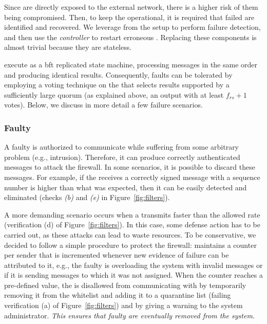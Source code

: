 Since \presieves are directly exposed to the external network, there is a higher risk of them being compromised.
Then, to keep the \sieveq operational, it is required that failed \presieves are identified and recovered.
We leverage from the \repsieve setup to perform failure detection, and then use the \emph{controller} to restart erroneous \presieves.
Replacing these components is almost trivial because they are stateless.

\Repsieves execute as a \gls{bft} replicated state machine, processing messages in the same order and producing identical results.
Consequently, \repsieves faults can be tolerated by employing a voting technique on the \postsieve that selects results supported by a sufficiently large quorum (as explained above, an output with at least $f_{rs} + 1$ votes).
Below, we discuss in more detail a few failure scenarios.



\subsubsection{Faulty \Sender}


A faulty \sender is authorized to communicate while suffering from some arbitrary problem (e.g., intrusion). 
Therefore, it can produce correctly authenticated messages to attack the firewall. 
In some scenarios, it is possible to discard these messages. 
For example, if the \sieveq receives a correctly signed message with a sequence number is higher than what was expected, then it can be easily detected and eliminated (checks \emph{(b)} and \emph{(e)} in Figure~\ref{fig:filters}).

A more demanding scenario occurs when a \sender transmits faster than the allowed rate (verification (d) of Figure~\ref{fig:filters}).
In this case, some defense action has to be carried out, as these attacks can lead \sieveq to waste resources.
To be conservative, we decided to follow a simple procedure to protect the firewall: \sieveq maintains a counter per sender that is incremented whenever new evidence of failure can be attributed to it, e.g., the faulty \sender is overloading the system with invalid messages or if it is sending messages to \presieves which it was not assigned.
When the counter reaches a pre-defined value, the \sender is disallowed from communicating with \sieveq by temporarily removing it from the whitelist and adding it to a quarantine list (failing verification (a) of Figure~\ref{fig:filters}) and by giving a warning to the system administrator.
\emph{This ensures that faulty \emph{\senders} are eventually removed from the system.}

